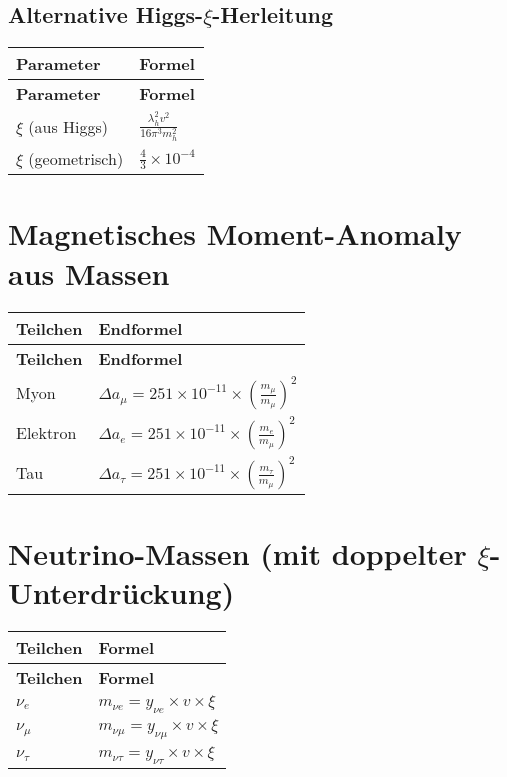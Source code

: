 \documentclass[12pt,a4paper]{article}
\begin{document}
	\subsection{Alternative Higgs-\(\xi\)-Herleitung}
	
	\begin{longtable}{|p{3cm}|p{5cm}|}
		\hline
		\textbf{Parameter} & \textbf{Formel} \\
		\hline
		\endfirsthead
		\hline
		\textbf{Parameter} & \textbf{Formel} \\
		\hline
		\endhead
		\(\xi\) (aus Higgs) & \(\frac{\lambda_h^{2}v^{2}}{16\pi^{3}m_h^{2}}\) \\
		\hline
		\(\xi\) (geometrisch) & \(\frac{4}{3} \times 10^{-4}\) \\
		\hline
	\end{longtable}
	
	\section{Magnetisches Moment-Anomaly aus Massen}
	
	\begin{longtable}{|p{2.5cm}|p{4.5cm}|}
		\hline
		\textbf{Teilchen} & \textbf{Endformel} \\
		\hline
		\endfirsthead
		\hline
		\textbf{Teilchen} & \textbf{Endformel} \\
		\hline
		\endhead
		Myon & \(\Delta a_{\mu} = 251 \times 10^{-11} \times \left(\frac{m_{\mu}}{m_{\mu}}\right)^{2}\) \\
		\hline
		Elektron & \(\Delta a_{e} = 251 \times 10^{-11} \times \left(\frac{m_{e}}{m_{\mu}}\right)^{2}\) \\
		\hline
		Tau & \(\Delta a_{\tau} = 251 \times 10^{-11} \times \left(\frac{m_{\tau}}{m_{\mu}}\right)^{2}\) \\
		\hline
	\end{longtable}
	
	\section{Neutrino-Massen (mit doppelter \(\xi\)-Unterdrückung)}
	
	\begin{longtable}{|p{3cm}|p{4cm}|}
		\hline
		\textbf{Teilchen} & \textbf{Formel} \\
		\hline
		\endfirsthead
		\hline
		\textbf{Teilchen} & \textbf{Formel} \\
		\hline
		\endhead
		\(\nu_e\) & \(m_{\nu e} = y_{\nu e} \times v \times \xi\) \\
		\hline
		\(\nu_{\mu}\) & \(m_{\nu \mu} = y_{\nu \mu} \times v \times \xi\) \\
		\hline
		\(\nu_{\tau}\) & \(m_{\nu \tau} = y_{\nu \tau} \times v \times \xi\) \\
		\hline
	\end{longtable}
	
\end{document}
